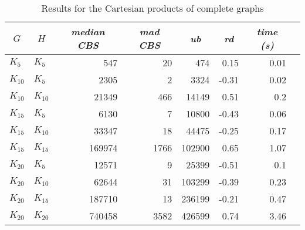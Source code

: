 \documentclass{scrartcl}
\theoremstyle{plain}
\newcommand{\cbs}{CBS}
\begin{document}
\begin{table}[!ht]
	\centering
	\scriptsize
	\begin{tabular}{|ll|rr|r|r|r|r|} 
	\hline
	\multicolumn{1}{|c}{$G$} &
	\multicolumn{1}{c|}{$H$} &
	\multicolumn{1}{c}{\emph{median \cbs{}}} &
	\multicolumn{1}{c|}{\emph{mad \cbs{}}} &
	\multicolumn{1}{c|}{\emph{ub}} &
	\multicolumn{1}{c|}{\emph{rd}} &
	\multicolumn{1}{c|}{\emph{time (s)}} \\ \hline
		
	\makeatletter{}$K_{5}$ & $K_{5}$ & 547 & 20 & 474 & 0.15 & 0.01 \\ 
$K_{10}$ & $K_{5}$ & 2305 & 2 & 3324 & -0.31 & 0.02 \\ 
$K_{10}$ & $K_{10}$ & 21349 & 466 & 14149 & 0.51 & 0.2 \\ 
$K_{15}$ & $K_{5}$ & 6130 & 7 & 10800 & -0.43 & 0.06 \\ 
$K_{15}$ & $K_{10}$ & 33347 & 18 & 44475 & -0.25 & 0.17 \\ 
$K_{15}$ & $K_{15}$ & 169974 & 1766 & 102900 & 0.65 & 1.07 \\ 
$K_{20}$ & $K_{5}$ & 12571 & 9 & 25399 & -0.51 & 0.1 \\ 
$K_{20}$ & $K_{10}$ & 62644 & 31 & 103299 & -0.39 & 0.23 \\ 
$K_{20}$ & $K_{15}$ & 187710 & 13 & 236199 & -0.21 & 0.47 \\ 
$K_{20}$ & $K_{20}$ & 740458 & 3582 & 426599 & 0.74 & 3.46 \\ 
 
	
	\hline
	\end{tabular}
	\caption{\label{tab:cart_kk_perf}Results for the Cartesian products of 
complete graphs}

\end{table}
\end{document}
